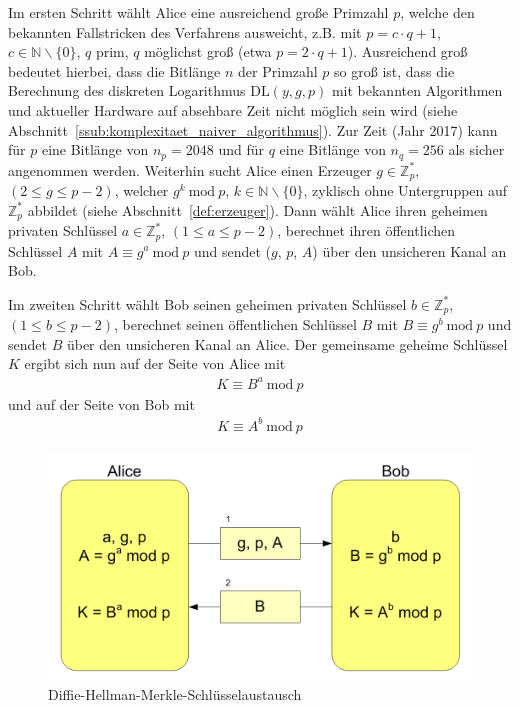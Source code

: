 \documentclass[
  a4paper,
  11pt,
]{scrartcl}
\theoremstyle{plain}
\theoremstyle{definition}
\theoremstyle{remark}
\newcommand{\N}{\mathbb{N}}
\newcommand{\Z}{\mathbb{Z}}
\newcommand{\Mod}[1]{\ \mathrm{mod}\ #1}
\begin{document}
Im ersten Schritt wählt Alice eine ausreichend große Primzahl $p$, welche den
bekannten Fallstricken des Verfahrens ausweicht, z.B. mit $p = c \cdot q+1$, $c
\in \N\backslash\{0\}$, $q$ prim, $q$ möglichst groß (etwa $p = 2 \cdot q + 1$).
Ausreichend groß bedeutet hierbei, dass die Bitlänge $n$ der Primzahl $p$ so
groß ist, dass die Berechnung des diskreten Logarithmus $\text{DL}(y,g,p)$ mit
bekannten Algorithmen und aktueller Hardware auf absehbare Zeit nicht möglich
sein wird (siehe Abschnitt~\ref{ssub:komplexitaet_naiver_algorithmus}). Zur Zeit
(Jahr 2017) kann für $p$ eine Bitlänge von $n_p = 2048$ und für $q$ eine
Bitlänge von $n_q = 256$ als
sicher angenommen
werden. Weiterhin sucht Alice einen Erzeuger $g \in \Z_p^*$, $(2 \leq g \leq p-2)$, welcher $g^k \Mod{p}$,
$k \in \N \backslash \{0\}$, zyklisch ohne Untergruppen auf $\Z_p^*$ abbildet
(siehe Abschnitt~\ref{def:erzeuger}). Dann wählt Alice ihren geheimen privaten
Schlüssel $a \in \Z_p^*$, $(1 \leq a \leq p-2)$,  berechnet ihren öffentlichen
Schlüssel $A$ mit $A \equiv g^a \Mod{p}$ und sendet ($g$, $p$, $A$) über den
unsicheren Kanal an Bob.

Im zweiten Schritt wählt Bob seinen geheimen privaten Schlüssel $b \in \Z_p^*$,
$(1 \leq b \leq p-2)$, berechnet seinen öffentlichen Schlüssel $B$ mit $B \equiv
g^b \Mod{p}$ und sendet $B$ über den unsicheren Kanal an Alice.
Der gemeinsame geheime Schlüssel $K$ ergibt sich nun auf der Seite von Alice mit
\begin{align*}
  K \equiv B^a \Mod{p}
\end{align*}
und auf der Seite von Bob mit
\begin{align*}
  K \equiv A^b \Mod{p}
\end{align*}

\begin{figure}[H]
  \centering
  \includegraphics[width=\textwidth]{Diffie-Hellman-Schluesselaustausch2.png}
  \caption{Diffie-Hellman-Merkle-Schlüsselaustausch}
  \label{fig:dhke}
\end{figure}
\end{document}
